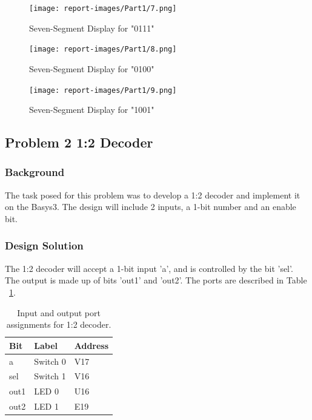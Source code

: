 \documentclass[11pt]{article}
\begin{document}
\begin{figure}[H]
\begin{center}
\texttt{[image: report-images/Part1/7.png]}
\caption{Seven-Segment Display for "0111"}
\label{fig:sevenSegSeven}
\end{center}
\end{figure}

\begin{figure}[H]
\begin{center}
\texttt{[image: report-images/Part1/8.png]}
\caption{Seven-Segment Display for "0100"}
\label{fig:sevenSegEight}
\end{center}
\end{figure}

\begin{figure}[H]
\begin{center}
\texttt{[image: report-images/Part1/9.png]}
\caption{\label{fig: fig-name} Seven-Segment Display for "1001"}
\label{fig:sevenSegNine}
\end{center}
\end{figure}

\pagebreak

\subsection{Problem 2 1:2 Decoder}

\subsubsection{Background}
The task posed for this problem was to develop a 1:2 decoder and implement it on the Basys3. The design will include 2 inputs, a 1-bit number and an enable bit.

\subsubsection{Design Solution}
The 1:2 decoder will accept a 1-bit input 'a', and is controlled by the bit 'sel'. The output is made up of bits 'out1' and 'out2'. The ports are described in Table ~\ref{tab:decoderPort}.

\begin{table}[h]
\begin{center}
		\begin{tabular}{| l | l | l |}
			\hline
			Bit & Label & Address \\ \hline
			a & Switch 0 & V17 \\ \hline
			sel & Switch 1 & V16 \\ \hline
			out1 & LED 0 & U16 \\ \hline
			out2 & LED 1 & E19 \\ \hline
		\end{tabular}
		\caption{\label{tab: tab-name} Input and output port assignments for 1:2 decoder.}
		\label{tab:decoderPort}
\end{center}
\end{table}
\end{document}
